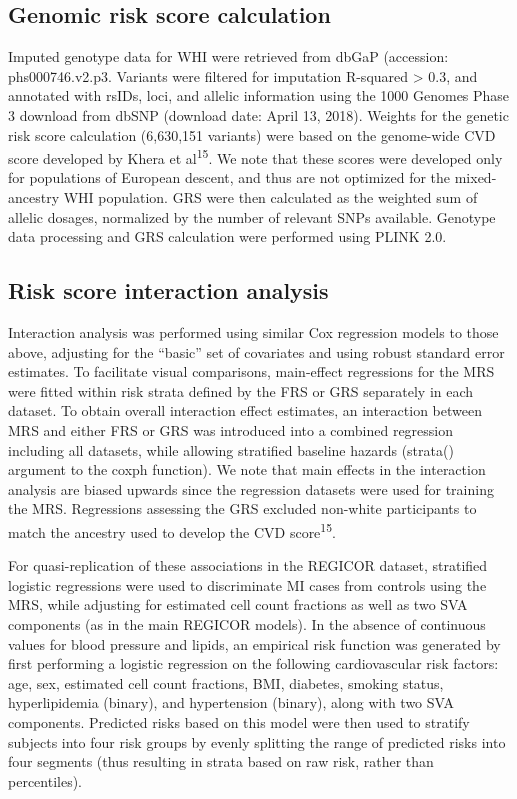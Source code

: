 \documentclass[]{article}
\begin{document}
\hypertarget{genomic-risk-score-calculation}{%
\subsection{Genomic risk score
calculation}\label{genomic-risk-score-calculation}}

Imputed genotype data for WHI were retrieved from dbGaP (accession:
phs000746.v2.p3. Variants were filtered for imputation R-squared
\textgreater{} 0.3, and annotated with rsIDs, loci, and allelic
information using the 1000 Genomes Phase 3 download from dbSNP (download
date: April 13, 2018). Weights for the genetic risk score calculation
(6,630,151 variants) were based on the genome-wide CVD score developed
by Khera et al\textsuperscript{15}. We note that these scores were
developed only for populations of European descent, and thus are not
optimized for the mixed-ancestry WHI population. GRS were then
calculated as the weighted sum of allelic dosages, normalized by the
number of relevant SNPs available. Genotype data processing and GRS
calculation were performed using PLINK 2.0.

\hypertarget{risk-score-interaction-analysis}{%
\subsection{Risk score interaction
analysis}\label{risk-score-interaction-analysis}}

Interaction analysis was performed using similar Cox regression models
to those above, adjusting for the ``basic'' set of covariates and using
robust standard error estimates. To facilitate visual comparisons,
main-effect regressions for the MRS were fitted within risk strata
defined by the FRS or GRS separately in each dataset. To obtain overall
interaction effect estimates, an interaction between MRS and either FRS
or GRS was introduced into a combined regression including all datasets,
while allowing stratified baseline hazards (strata() argument to the
coxph function). We note that main effects in the interaction analysis
are biased upwards since the regression datasets were used for training
the MRS. Regressions assessing the GRS excluded non-white participants
to match the ancestry used to develop the CVD score\textsuperscript{15}.

For quasi-replication of these associations in the REGICOR dataset,
stratified logistic regressions were used to discriminate MI cases from
controls using the MRS, while adjusting for estimated cell count
fractions as well as two SVA components (as in the main REGICOR models).
In the absence of continuous values for blood pressure and lipids, an
empirical risk function was generated by first performing a logistic
regression on the following cardiovascular risk factors: age, sex,
estimated cell count fractions, BMI, diabetes, smoking status,
hyperlipidemia (binary), and hypertension (binary), along with two SVA
components. Predicted risks based on this model were then used to
stratify subjects into four risk groups by evenly splitting the range of
predicted risks into four segments (thus resulting in strata based on
raw risk, rather than percentiles).
\end{document}
